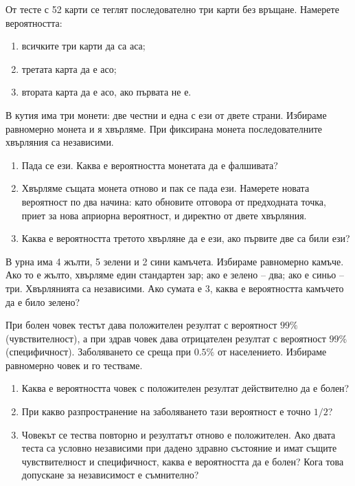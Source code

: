 \documentclass[11pt,a4paper]{article}
\newenvironment{enumeratea}{\begin{enumerate}[label=(\alph*),itemsep=0.28em,topsep=0.25em]}{\end{enumerate}}
\newcounter{problem}[section]
\begin{document}
\begin{problembook}
От тесте с 52 карти се теглят последователно три карти без връщане.
Намерете вероятността:
\begin{enumeratea}
  \item всичките три карти да са аса;
  \item третата карта да е асо;
  \item втората карта да е асо, ако първата не е.
\end{enumeratea}
\end{problembook}

\begin{problembook}
В кутия има три монети: две честни и една с ези от двете страни.
Избираме равномерно монета и я хвърляме. При фиксирана монета
последователните хвърляния са независими.
\begin{enumeratea}
  \item Пада се ези. Каква е вероятността монетата да е фалшивата?
  \item Хвърляме същата монета отново и пак се пада ези. Намерете новата
  вероятност по два начина: като обновите отговора от предходната точка,
  приет за нова априорна вероятност, и директно от двете хвърляния.
  \item Каква е вероятността третото хвърляне да е ези, ако първите две
  са били ези?
\end{enumeratea}
\end{problembook}

\begin{problempencil}[К1, СЕМ 2023]
В урна има 4 жълти, 5 зелени и 2 сини камъчета. Избираме равномерно камъче.
Ако то е жълто, хвърляме един стандартен зар; ако е зелено -- два;
ако е синьо -- три. Хвърлянията са независими.
Ако сумата е 3, каква е вероятността камъчето да е било зелено?
\end{problempencil}

\begin{problembook}
При болен човек тестът дава положителен резултат с вероятност $99\%$
(чувствителност), а при здрав човек дава отрицателен резултат с вероятност
$99\%$ (специфичност). Заболяването се среща при $0.5\%$ от населението.
Избираме равномерно човек и го тестваме.
\begin{enumeratea}
  \item Каква е вероятността човек с положителен резултат действително
  да е болен?
  \item При какво разпространение на заболяването тази вероятност е
  точно $1/2$?
  \item Човекът се тества повторно и резултатът отново е положителен.
  Ако двата теста са условно независими при дадено здравно състояние
  и имат същите чувствителност и специфичност, каква е вероятността
  да е болен? Кога това допускане за независимост е съмнително?
\end{enumeratea}
\end{problembook}
\end{document}

